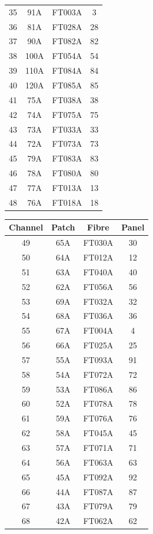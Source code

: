 \documentclass[12pt]{report}
\begin{document}
\begin{table}
\begin{center}
\begin{tabular}{|c|c|c|c|}
			35 & 91A & FT003A & 3 \\
			36 & 81A & FT028A & 28 \\
			37 & 90A & FT082A & 82 \\
			38 & 100A & FT054A & 54 \\
			39 & 110A & FT084A & 84 \\
			40 & 120A & FT085A & 85 \\
			41 & 75A & FT038A & 38 \\
			42 & 74A & FT075A & 75 \\
			43 & 73A & FT033A & 33 \\
			44 & 72A & FT073A & 73 \\
			45 & 79A & FT083A & 83 \\
			46 & 78A & FT080A & 80 \\
			47 & 77A & FT013A & 13 \\
			48 & 76A & FT018A & 18 \\
			\hline
		\end{tabular}
		\hspace{2cm}
		\begin{tabular}{|c|c|c|c|}
			\hline
			Channel & Patch & Fibre & Panel \\
			\hline
			49 & 65A & FT030A & 30 \\
			50 & 64A & FT012A & 12 \\
			51 & 63A & FT040A & 40 \\
			52 & 62A & FT056A & 56 \\
			53 & 69A & FT032A & 32 \\
			54 & 68A & FT036A & 36 \\
			55 & 67A & FT004A & 4 \\
			56 & 66A & FT025A & 25 \\
			57 & 55A & FT093A & 91 \\
			58 & 54A & FT072A & 72 \\
			59 & 53A & FT086A & 86 \\
			60 & 52A & FT078A & 78 \\
			61 & 59A & FT076A & 76 \\
			62 & 58A & FT045A & 45 \\
			63 & 57A & FT071A & 71 \\
			64 & 56A & FT063A & 63 \\
			65 & 45A & FT092A & 92 \\
			66 & 44A & FT087A & 87 \\
			67 & 43A & FT079A & 79 \\
			68 & 42A & FT062A & 62 \\

\end{tabular}
\end{center}
\end{table}
\end{document}
